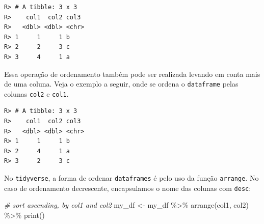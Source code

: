 \documentclass[
  11pt,
]{book}
\newenvironment{Shaded}{\begin{snugshade}}{\end{snugshade}}
\newcommand{\CommentTok}[1]{\textcolor[rgb]{0.37,0.37,0.37}{\textit{#1}}}
\newcommand{\FunctionTok}[1]{\textcolor[rgb]{0,0,0}{#1}}
\newcommand{\NormalTok}[1]{#1}
\newcommand{\OtherTok}[1]{\textcolor[rgb]{0.37,0.37,0.37}{#1}}
\newcommand{\SpecialCharTok}[1]{\textcolor[rgb]{0,0,0}{#1}}
\begin{document}
\begin{Shaded}
\end{Shaded}

\begin{verbatim}
R> # A tibble: 3 x 3
R>    col1  col2 col3 
R>   <dbl> <dbl> <chr>
R> 1     1     1 b    
R> 2     2     3 c    
R> 3     4     1 a
\end{verbatim}

Essa operação de ordenamento também pode ser realizada levando em conta mais de uma coluna. Veja o exemplo a seguir, onde se ordena o \texttt{dataframe} pelas colunas \texttt{col2} e \texttt{col1}.

\begin{Shaded}
\end{Shaded}

\begin{verbatim}
R> # A tibble: 3 x 3
R>    col1  col2 col3 
R>   <dbl> <dbl> <chr>
R> 1     1     1 b    
R> 2     4     1 a    
R> 3     2     3 c
\end{verbatim}

No \texttt{tidyverse}, a forma de ordenar \texttt{dataframes} é pelo uso da função \texttt{arrange}. No caso de ordenamento decrescente, encapsulamos o nome das colunas com \texttt{desc}: 

\begin{Shaded}
\begin{Highlighting}[]
\CommentTok{\# sort ascending, by col1 and col2}
\NormalTok{my\_df }\OtherTok{\textless{}{-}}\NormalTok{ my\_df }\SpecialCharTok{\%\textgreater{}\%}
  \FunctionTok{arrange}\NormalTok{(col1, col2) }\SpecialCharTok{\%\textgreater{}\%}
  \FunctionTok{print}\NormalTok{()}
\end{Highlighting}
\end{Shaded}
\end{document}
